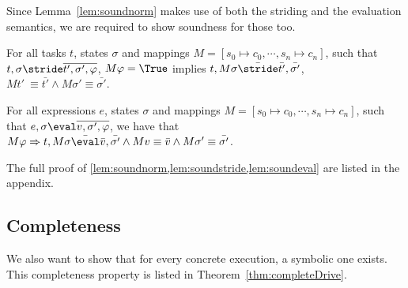 Since Lemma~\ref{lem:soundnorm} makes use of both the striding and the evaluation semantics,
we are required to show soundness for those too.

\begin{lemma}
  \label{lem:soundstride}

  For all tasks $t$, states $\sigma$ and mappings $M=[s_0\mapsto c_0,\cdots,s_n\mapsto c_n]$,
  such that $t,\sigma\stride \overline{t',\sigma',\phi}$,
  $M \phi= \True$ implies
  $t,M\sigma \bar{\stride}\bar{t'},\bar{\sigma'}$, $M t'\ \equiv \bar{t'} \land M\sigma' \equiv \bar{\sigma'}$.

\end{lemma}

\begin{lemma}
  \label{lem:soundeval}

  For all expressions $e$, states $\sigma$ and mappings $M=[s_0\mapsto c_0,\cdots,s_n\mapsto c_n]$,
  such that $e,\sigma\eval \overline{v,\sigma',\phi}$,
  we have that $M\phi \implies t,M\sigma \bar{\eval}\bar{v},\bar{\sigma'} \land Mv \equiv \bar{v} \wedge M\sigma' \equiv \bar{\sigma'}$.

\end{lemma}

The full proof of \cref{lem:soundnorm,lem:soundstride,lem:soundeval} are listed in the appendix.





\subsection{Completeness}

We also want to show that for every concrete execution, a symbolic one exists.
This completeness property is listed in Theorem~\ref{thm:completeDrive}.

%

